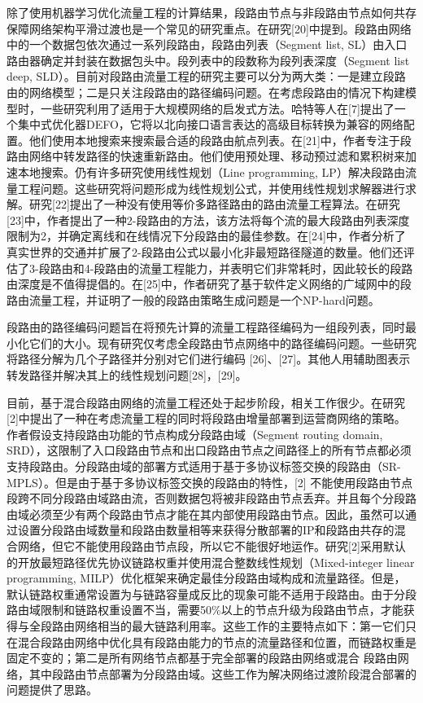 除了使用机器学习优化流量工程的计算结果，段路由节点与非段路由节点如何共存保障网络架构平滑过渡也是一个常见的研究重点。在研究[20]中提到。段路由网络中的一个数据包依次通过一系列段路由，段路由列表（Segment list, SL）由入口路由器确定并封装在数据包头中。段列表中的段数称为段列表深度（Segment list deep, SLD）。目前对段路由流量工程的研究主要可以分为两大类：一是建立段路由的网络模型；二是只关注段路由的路径编码问题。在考虑段路由的情况下构建模型时，一些研究利用了适用于大规模网络的启发式方法。哈特等人在[7]提出了一个集中式优化器DEFO，它将以北向接口语言表达的高级目标转换为兼容的网络配置。他们使用本地搜索来搜索最合适的段路由航点列表。在[21]中，作者专注于段路由网络中转发路径的快速重新路由。他们使用预处理、移动预过滤和累积树来加速本地搜索。仍有许多研究使用线性规划（Line programming, LP）解决段路由流量工程问题。这些研究将问题形成为线性规划公式，并使用线性规划求解器进行求解。研究[22]提出了一种没有使用等价多路径路由的路由流量工程算法。在研究[23]中，作者提出了一种2-段路由的方法，该方法将每个流的最大段路由列表深度限制为2，并确定离线和在线情况下分段路由的最佳参数。在[24]中，作者分析了真实世界的交通并扩展了2-段路由公式以最小化非最短路径隧道的数量。他们还评估了3-段路由和4-段路由的流量工程能力，并表明它们非常耗时，因此较长的段路由深度是不值得提倡的。在[25]中，作者研究了基于软件定义网络的广域网中的段路由流量工程，并证明了一般的段路由策略生成问题是一个NP-hard问题。

段路由的路径编码问题旨在将预先计算的流量工程路径编码为一组段列表，同时最小化它们的大小。现有研究仅考虑全段路由节点网络中的路径编码问题。一些研究将路径分解为几个子路径并分别对它们进行编码 [26]、[27]。其他人用辅助图表示转发路径并解决其上的线性规划问题[28]，[29]。

目前，基于混合段路由网络的流量工程还处于起步阶段，相关工作很少。在研究[2]中提出了一种在考虑流量工程的同时将段路由增量部署到运营商网络的策略。作者假设支持段路由功能的节点构成分段路由域（Segment routing domain, SRD），这限制了入口段路由节点和出口段路由节点之间路径上的所有节点都必须支持段路由。分段路由域的部署方式适用于基于多协议标签交换的段路由（SR-MPLS）。但是由于基于多协议标签交换的段路由的特性，[2] 不能使用段路由节点段跨不同分段路由域路由流，否则数据包将被非段路由节点丢弃。并且每个分段路由域必须至少有两个段路由节点才能在其内部使用段路由节点。因此，虽然可以通过设置分段路由域数量和段路由数量相等来获得分散部署的IP和段路由共存的混合网络，但它不能使用段路由节点段，所以它不能很好地运作。研究[2]采用默认的开放最短路径优先协议链路权重并使用混合整数线性规划（Mixed-integer linear programming, MILP）优化框架来确定最佳分段路由域构成和流量路径。但是，默认链路权重通常设置为与链路容量成反比的现象可能不适用于段路由。由于分段路由域限制和链路权重设置不当，需要50\%以上的节点升级为段路由节点，才能获得与全段路由网络相当的最大链路利用率。这些工作的主要特点如下：第一它们只在混合段路由网络中优化具有段路由能力的节点的流量路径和位置，而链路权重是固定不变的；第二是所有网络节点都基于完全部署的段路由网络或混合 段路由网络，其中段路由节点部署为分段路由域。这些工作为解决网络过渡阶段混合部署的问题提供了思路。

